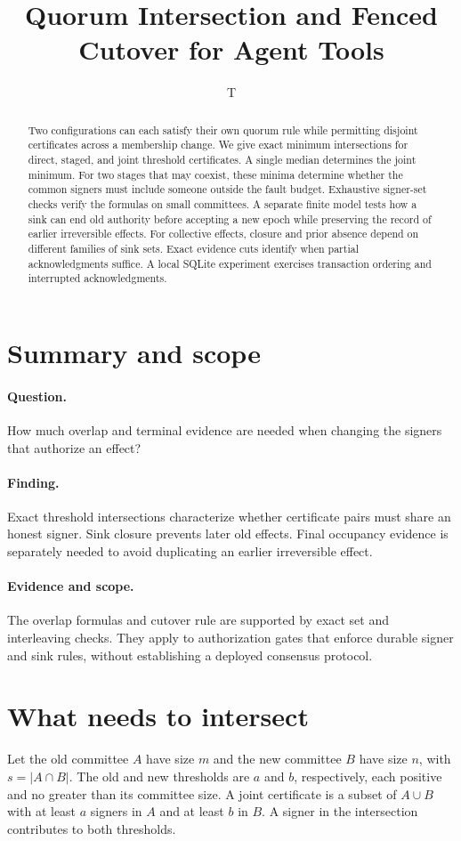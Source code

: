 \documentclass[11pt]{article}
\title{Quorum Intersection and Fenced Cutover for Agent Tools}
\author{T}
\date{}
\begin{document}
\maketitle
\begin{abstract}
Two configurations can each satisfy their own quorum rule while
permitting disjoint certificates across a membership change.
We give exact minimum intersections for direct, staged, and
joint threshold certificates. A single median determines the
joint minimum. For two stages that may coexist, these minima
determine whether the common signers must include someone outside
the fault budget. Exhaustive signer-set checks verify the formulas
on small committees. A separate finite model tests how a sink
can end old authority before accepting a new epoch while
preserving the record of earlier irreversible effects. For
collective effects, closure and prior absence depend on different
families of sink sets. Exact evidence cuts identify when partial
acknowledgments suffice. A local SQLite experiment exercises
transaction ordering and interrupted acknowledgments.
\end{abstract}

\section*{Summary and scope}
\paragraph{Question.} How much overlap and terminal evidence are needed
when changing the signers that authorize an effect?
\paragraph{Finding.} Exact threshold intersections characterize whether
certificate pairs must share an honest signer. Sink closure prevents
later old effects. Final occupancy evidence is separately needed to avoid
duplicating an earlier irreversible effect.
\paragraph{Evidence and scope.} The overlap formulas and cutover
rule are supported by exact set and interleaving checks. They apply to
authorization gates that enforce durable signer and sink rules, without
establishing a deployed consensus protocol.

\section{What needs to intersect}
Let the old committee $A$ have size $m$ and the new committee
$B$ have size $n$, with $s=|A\cap B|$. The old and new thresholds
are $a$ and $b$, respectively, each positive and no greater than
its committee size. A joint certificate is a subset of $A\cup B$
with at least $a$ signers in $A$ and at least $b$ in $B$. A signer
in the intersection contributes to both thresholds.
\end{document}
